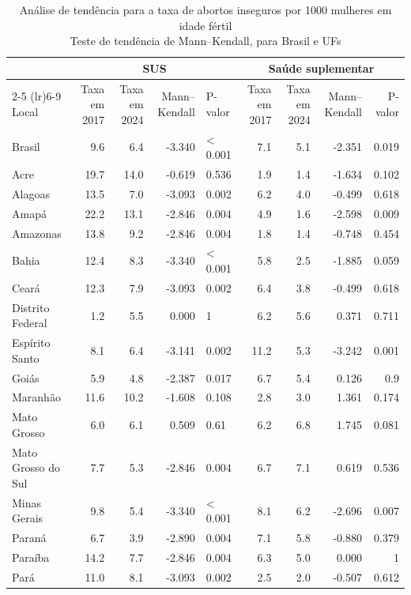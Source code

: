 \begin{table}[!t]
\caption*{
{\large Análise de tendência para a taxa de abortos inseguros por 1000 mulheres em idade fértil} \\ 
{\small Teste de tendência de Mann–Kendall, para Brasil e UFs}
} 
\fontsize{12.0pt}{14.4pt}\selectfont
\begin{tabular*}{\linewidth}{@{\extracolsep{\fill}}lrrrlrrrr}
\toprule
 & \multicolumn{4}{c}{SUS} & \multicolumn{4}{c}{Saúde suplementar} \\ 
\cmidrule(lr){2-5} \cmidrule(lr){6-9}
Local & Taxa em 2017 & Taxa em 2024 & Mann–Kendall & P-valor & Taxa em 2017 & Taxa em 2024 & Mann–Kendall & P-valor \\ 
\midrule\addlinespace[2.5pt]
Brasil & 9.6 & 6.4 & -3.340 & < 0.001 & 7.1 & 5.1 & -2.351 & 0.019 \\ 
Acre & 19.7 & 14.0 & -0.619 & 0.536 & 1.9 & 1.4 & -1.634 & 0.102 \\ 
Alagoas & 13.5 & 7.0 & -3.093 & 0.002 & 6.2 & 4.0 & -0.499 & 0.618 \\ 
Amapá & 22.2 & 13.1 & -2.846 & 0.004 & 4.9 & 1.6 & -2.598 & 0.009 \\ 
Amazonas & 13.8 & 9.2 & -2.846 & 0.004 & 1.8 & 1.4 & -0.748 & 0.454 \\ 
Bahia & 12.4 & 8.3 & -3.340 & < 0.001 & 5.8 & 2.5 & -1.885 & 0.059 \\ 
Ceará & 12.3 & 7.9 & -3.093 & 0.002 & 6.4 & 3.8 & -0.499 & 0.618 \\ 
Distrito Federal & 1.2 & 5.5 & 0.000 & 1 & 6.2 & 5.6 & 0.371 & 0.711 \\ 
Espírito Santo & 8.1 & 6.4 & -3.141 & 0.002 & 11.2 & 5.3 & -3.242 & 0.001 \\ 
Goiás & 5.9 & 4.8 & -2.387 & 0.017 & 6.7 & 5.4 & 0.126 & 0.9 \\ 
Maranhão & 11.6 & 10.2 & -1.608 & 0.108 & 2.8 & 3.0 & 1.361 & 0.174 \\ 
Mato Grosso & 6.0 & 6.1 & 0.509 & 0.61 & 6.2 & 6.8 & 1.745 & 0.081 \\ 
Mato Grosso do Sul & 7.7 & 5.3 & -2.846 & 0.004 & 6.7 & 7.1 & 0.619 & 0.536 \\ 
Minas Gerais & 9.8 & 5.4 & -3.340 & < 0.001 & 8.1 & 6.2 & -2.696 & 0.007 \\ 
Paraná & 6.7 & 3.9 & -2.890 & 0.004 & 7.1 & 5.8 & -0.880 & 0.379 \\ 
Paraíba & 14.2 & 7.7 & -2.846 & 0.004 & 6.3 & 5.0 & 0.000 & 1 \\ 
Pará & 11.0 & 8.1 & -3.093 & 0.002 & 2.5 & 2.0 & -0.507 & 0.612 \\ 

\end{tabular*}
\end{table}
